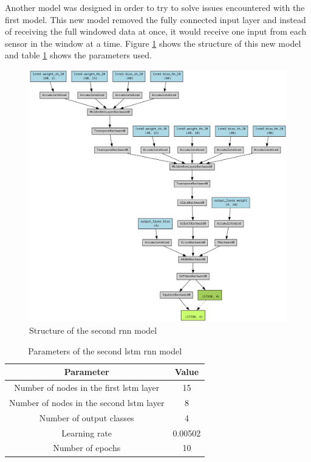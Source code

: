 Another model was designed in order to try to solve issues encountered with the first model. This new model removed the fully connected
input layer and instead of receiving the full windowed data at once, it would receive one input from each sensor in the window at a time.
Figure \ref{fig:rnn_struct2} shows the structure of this new model and table \ref{table:rnn_params2} shows the parameters used.

\begin{figure}[h]
    \centering
    \includegraphics[scale=0.21]{images/rnn_struct_2.png}
    \caption{Structure of the second \acrshort{rnn} model}
    \label{fig:rnn_struct2}
\end{figure}

\begin{table}[h]
    \centering
    \caption{Parameters of the second \acrshort{lstm} \acrshort{rnn} model}
    \label{table:rnn_params2}
    \begin{tabular}{|c|c|}
        \hline
        \textbf{Parameter} & \textbf{Value} \\ \hline
        Number of nodes in the first \acrshort{lstm} layer & 15 \\ \hline
        Number of nodes in the second \acrshort{lstm} layer & 8 \\ \hline
        Number of output classes & 4 \\ \hline
        Learning rate & 0.00502 \\ \hline
        Number of epochs & 10 \\ \hline
    \end{tabular}
\end{table}

